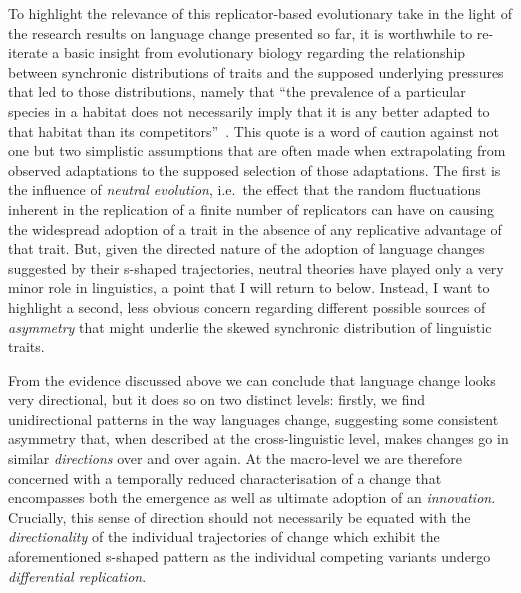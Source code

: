 To highlight the relevance of this replicator-based evolutionary take in the light of the research results on language change presented so far, it is worthwhile to re-iterate a basic insight from evolutionary biology regarding the relationship between synchronic distributions of traits and the supposed underlying pressures that led to those distributions, namely that ``the prevalence of a particular species in a habitat does not necessarily imply that it is any better adapted to that habitat than its competitors''~\citep[p.2]{Blythe2012copying}.
This quote is a word of caution against not one but two simplistic assumptions that are often made when extrapolating from observed adaptations to the supposed selection of those adaptations. The first is the influence of \emph{neutral evolution}, 
i.e.~the effect that the random fluctuations inherent in the replication of a finite number of replicators can have on causing the widespread adoption of a trait in the absence of any replicative advantage of that trait. But, given the directed nature of the adoption of language changes suggested by their s-shaped trajectories, neutral theories have played only a very minor role in linguistics, a point that I will return to below.
Instead, I want to highlight a second, less obvious concern regarding different possible sources of \emph{asymmetry} that might underlie the skewed synchronic distribution of linguistic traits.

From the evidence discussed above we can conclude that language change looks very directional, but it does so on two distinct levels: firstly, we find unidirectional patterns in the way languages change, suggesting some consistent asymmetry that, when described at the cross-linguistic level, makes changes go in similar \emph{directions} over and over again. At the macro-level we are therefore concerned with a temporally reduced characterisation of a change that encompasses both the emergence as well as ultimate adoption of an \emph{innovation}.
Crucially, this sense of direction should not necessarily be equated with the \emph{directionality} of the individual trajectories of change which exhibit the aforementioned s-shaped pattern as the individual competing variants undergo \emph{differential replication}. %

